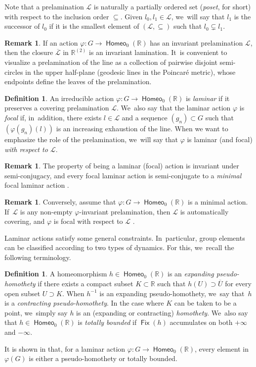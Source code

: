 \documentclass[JEP,XML,SOM,Unicode,NoFloatCountersInSection,published]{cedram}
\theoremstyle{definition}
\newtheorem{dfn}[thm]{Definition}
\newtheorem{rem}[thm]{Remark}
\DeclareMathOperator{\Fix}{\mathsf{Fix}}\let\fix\Fix
\DeclareMathOperator{\homeo}{\mathsf{Homeo}}
\newcommand{\R}{\mathbb{R}}
\newcommand{\Lcal}{\mathcal{L}}
\begin{document}
Note that a prelamination $\Lcal$ is naturally a partially ordered set (\emph{poset}, for short) with respect to the inclusion order $\subseteq$. Given $l_0, l_1\in \Lcal$, we~will say that $l_1$ is the successor of $l_0$ if it is the smallest element of $(\Lcal, \subseteq)$ such that $l_0\subsetneq l_1$.

\begin{rem}
If an action $\varphi \colon G \to \homeo_0(\R)$ has an invariant prelamination $\Lcal$, then the closure $\overline{\mathcal L}$ in $\R^{(2)}$ is an invariant lamination. It~is convenient to visualize a prelamination of the line as a collection of pairwise disjoint semi-circles in the upper half-plane (\ie geodesic lines in the Poincaré metric), whose endpoints define the leaves of the prelamination.
\end{rem}

\begin{dfn}\label{def.lamination}
An irreducible action $\varphi\colon G\to\homeo_0(\R)$ is \emph{laminar} if it preserves a covering prelamination $\Lcal$. We~also say that the laminar action $\varphi$ is \emph{focal} if, in~addition, there exists $l\in\Lcal$ and a sequence $(g_n)\subset G$ such that $(\varphi(g_n)(l))$ is an increasing exhaustion of the line. When we want to emphasize the role of the prelamination, we~will say that $\varphi$ is laminar (and focal) \emph{with respect to $\Lcal$}.
\end{dfn}

\begin{rem}
The property of being a laminar (focal) action is invariant under semi-conjugacy, and every focal laminar action is semi-conjugate to a \emph{minimal} focal laminar action \cite[Prop.\,8.1.14]{BMRT}.
\end{rem}
\begin{rem}\label{r-minimal-implies-focal}
Conversely, assume that $\varphi\colon G\to\homeo_0(\R)$ is a {minimal} action. If~$\Lcal$ is any non-empty $\varphi$-invariant prelamination, then $\Lcal$ is automatically covering, and $\varphi$ is focal with respect to $\Lcal$ \cite[Prop.\,8.1.15]{BMRT}.
\end{rem}

Laminar actions satisfy some general constraints. In~particular, group elements can be classified according to two types of dynamics. For this, we~recall the following terminology.

\begin{dfn} \label{d-expanding-homothety}
A homeomorphism $h\in\homeo_0(\R)$ is an \emph{expanding pseudo-homothety} if there exists a compact subset $K\subset \R$ such that $h(U)\supset \overline{U}$ for every open subset $U\supset K$.
When $h^{-1}$ is an expanding pseudo-homothety, we~say that~$h$ is a \emph{contracting pseudo-homothety}. In the case where $K$ can be taken to be a point, we~simply say $h$ is an (expanding or contracting) \emph{homothety}. We~also say that $h\in \homeo_0(\R)$ is \emph{totally bounded} if $\Fix(h)$ accumulates on both $+\infty$ and $-\infty$.
\end{dfn}
It is shown in \cite[Prop.\,8.1.13]{BMRT} that, for a laminar action $\varphi \colon G\to \homeo_0(\R)$, every element in $\varphi(G)$ is either a pseudo-homothety or totally bounded.
\end{document}
